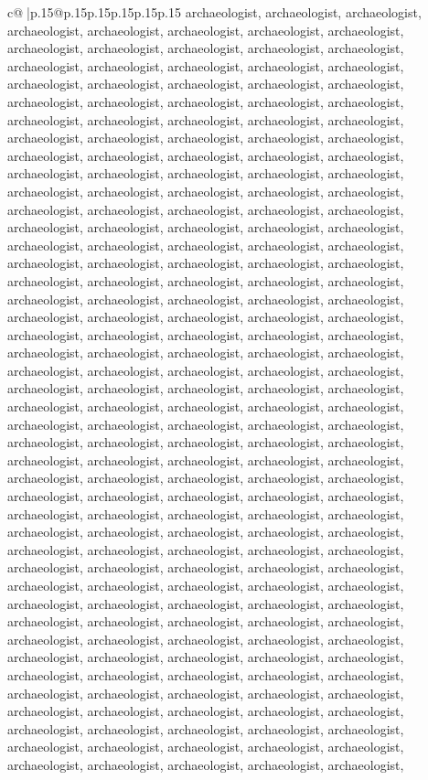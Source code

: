 \documentclass{article}
\begin{document}
{\begin{supertabular}{c@{$\;$}|p{.15\linewidth}@{}p{.15\linewidth}p{.15\linewidth}p{.15\linewidth}p{.15\linewidth}p{.15\linewidth}}
{{{archaeologist, archaeologist, archaeologist, archaeologist, archaeologist, archaeologist, archaeologist, archaeologist, archaeologist, archaeologist, archaeologist, archaeologist, archaeologist, archaeologist, archaeologist, archaeologist, archaeologist, archaeologist, archaeologist, archaeologist, archaeologist, archaeologist, archaeologist, archaeologist, archaeologist, archaeologist, archaeologist, archaeologist, archaeologist, archaeologist, archaeologist, archaeologist, archaeologist, archaeologist, archaeologist, archaeologist, archaeologist, archaeologist, archaeologist, archaeologist, archaeologist, archaeologist, archaeologist, archaeologist, archaeologist, archaeologist, archaeologist, archaeologist, archaeologist, archaeologist, archaeologist, archaeologist, archaeologist, archaeologist, archaeologist, archaeologist, archaeologist, archaeologist, archaeologist, archaeologist, archaeologist, archaeologist, archaeologist, archaeologist, archaeologist, archaeologist, archaeologist, archaeologist, archaeologist, archaeologist, archaeologist, archaeologist, archaeologist, archaeologist, archaeologist, archaeologist, archaeologist, archaeologist, archaeologist, archaeologist, archaeologist, archaeologist, archaeologist, archaeologist, archaeologist, archaeologist, archaeologist, archaeologist, archaeologist, archaeologist, archaeologist, archaeologist, archaeologist, archaeologist, archaeologist, archaeologist, archaeologist, archaeologist, archaeologist, archaeologist, archaeologist, archaeologist, archaeologist, archaeologist, archaeologist, archaeologist, archaeologist, archaeologist, archaeologist, archaeologist, archaeologist, archaeologist, archaeologist, archaeologist, archaeologist, archaeologist, archaeologist, archaeologist, archaeologist, archaeologist, archaeologist, archaeologist, archaeologist, archaeologist, archaeologist, archaeologist, archaeologist, archaeologist, archaeologist, archaeologist, archaeologist, archaeologist, archaeologist, archaeologist, archaeologist, archaeologist, archaeologist, archaeologist, archaeologist, archaeologist, archaeologist, archaeologist, archaeologist, archaeologist, archaeologist, archaeologist, archaeologist, archaeologist, archaeologist, archaeologist, archaeologist, archaeologist, archaeologist, archaeologist, archaeologist, archaeologist, archaeologist, archaeologist, archaeologist, archaeologist, archaeologist, archaeologist, archaeologist, archaeologist, archaeologist, archaeologist, archaeologist, archaeologist, archaeologist, archaeologist, archaeologist, archaeologist, archaeologist, archaeologist, archaeologist, archaeologist, archaeologist, archaeologist, archaeologist, archaeologist, archaeologist, archaeologist, archaeologist, archaeologist, archaeologist, archaeologist, archaeologist, archaeologist, archaeologist, archaeologist, archaeologist, archaeologist, archaeologist, archaeologist, archaeologist, archaeologist, archaeologist, archaeologist, archaeologist, archaeologist, archaeologist, archaeologist, archaeologist, archaeologist, archaeologist, archaeologist, archaeologist, archaeologist, archaeologist, archaeologist, archaeologist, archaeologist, archaeologist, }}}
\end{supertabular}}
\end{document}
